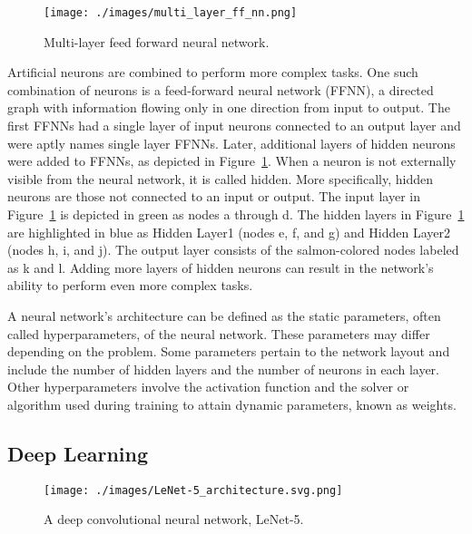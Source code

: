 \begin{figure}[h]
    \texttt{[image: ./images/multi\_layer\_ff\_nn.png]}
    \caption{Multi-layer feed forward neural network.}
    \label{fig:multi_ffnn}
\end{figure}

Artificial neurons are combined to perform more complex tasks. One such
combination of neurons is a feed-forward neural network (FFNN), a directed graph
with information flowing only in one direction from input to output. The first
FFNNs had a single layer of input neurons connected to an output layer and were
aptly names single layer FFNNs.
Later, additional layers of hidden neurons were added to FFNNs, as depicted in
Figure~\ref{fig:multi_ffnn}.  When a neuron is not externally visible from the
neural network, it is called hidden. More specifically, hidden neurons are those
not connected to an input or output. The input layer in
Figure~\ref{fig:multi_ffnn} is depicted in green as nodes a through d. The
hidden layers in Figure~\ref{fig:multi_ffnn} are highlighted in blue as Hidden
Layer1 (nodes e, f, and g) and Hidden Layer2 (nodes h, i, and j). The output
layer consists of the salmon-colored nodes labeled as k and l. Adding more
layers of hidden neurons can result in the network's ability to perform even
more complex tasks.

A neural network's architecture can be defined as the static parameters, often
called hyperparameters, of the neural network.  These parameters may differ
depending on the problem. Some parameters pertain to the network layout and
include the number of hidden layers and the number of neurons in each layer.  Other
hyperparameters involve the activation function and the solver or algorithm used
during training to attain dynamic parameters, known as weights.

\subsection{Deep Learning}

\begin{figure}[h]
    \texttt{[image: ./images/LeNet-5\_architecture.svg.png]}
    \caption{A deep convolutional neural network, LeNet-5\cite{zhang2023dive}.}
    \label{fig:lenet5}
\end{figure}

